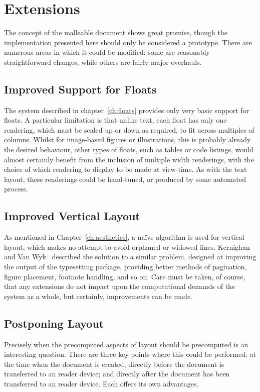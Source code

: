 \section{Extensions}
The concept of the malleable document shows great promise, though the implementation presented here should only be considered a prototype. There are numerous areas in which it could be modified: some are reasonably straightforward changes, while others are fairly major overhauls.

\subsection{Improved Support for Floats}
The system described in chapter~\ref{ch:floats} provides only very basic support for floats. A particular limitation is that unlike text, each float has only one rendering, which must be scaled up or down as required, to fit across multiples of columns. Whilst for image-based figures or illustrations, this is probably already the desired behaviour, other types of floats, such as tables or code listings, would almost certainly benefit from the inclusion of multiple width renderings, with the choice of which rendering to display to be made at view-time. As with the text layout, these renderings could be hand-tuned, or produced by some automated process. 

\subsection{Improved Vertical Layout}
As mentioned in Chapter~\ref{ch:aesthetics}, a na\"ive algorithm is used for vertical layout, which makes no attempt to avoid orphaned or widowed lines. Kernighan and Van Wyk~\cite{Kernighan1989} described the solution to a similar problem, designed at improving the output of the \troff{} typesetting package, providing better methods of pagination, figure placement, footnote handling, and so on. Care must be taken, of course, that any extensions do not impact upon the computational demands of the system as a whole, but certainly, improvements can be made.


\subsection{Postponing Layout}
\label{sec:postponing}
Precisely when the precomputed aspects of layout should be precomputed is an interesting question. There are three key points where this could be performed: at the time when the document is created; directly before the document is transferred to an \ebook{} reader device; and directly after the document has been transferred to an \ebook{} reader device. Each offers its own advantages.

